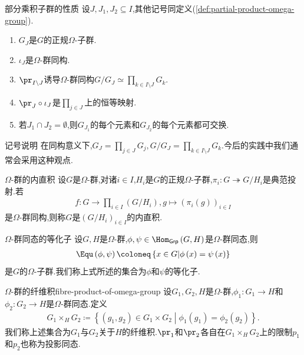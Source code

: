 \begin{proposition}{部分乘积子群的性质}{}
	设$J,J_{1},J_{2}\subseteq I$,其他记号同定义(\ref{def:partial-product-omega-group}).
	\begin{enumerate}
		\item $G_{J}$是$G$的正规$\Omega$-子群.
		\item $\iota_{J}$是$\Omega$-群同构.
		\item $\pr_{I\setminus J}$诱导$\Omega$-群同构$G/G_{J}\simeq\prod\limits_{k\in I\setminus J}G_{k}$.
		\item $\pr_{J}\circ\iota_{J}$是$\prod\limits_{j\in J}$上的恒等映射.
		\item 若$J_{1}\cap J_{2}=\emptyset$,则$G_{J_{1}}$的每个元素和$G_{J_{2}}$的每个元素都可交换.
	\end{enumerate}
\end{proposition}

\begin{remark}{记号说明}{}
	在同构意义下,$G_{J}=\prod\limits_{j\in J}G_{j},G/G_{J}=\prod\limits_{k\in I\setminus J}G_{k}$.今后的实践中我们通常会采用这种观点.
\end{remark}

\begin{definition}{$\Omega$-群的内直积}{}
	设$G$是$\Omega$-群,对诸$i\in I$,$H_{i}$是$G$的正规$\Omega$-子群,$\pi_{i}:G\twoheadrightarrow G/H_{i}$是典范投射.若
	\begin{align*}
		f:G\to\prod\limits_{i\in I}\left(G/H_{i}\right),g\mapsto\left(\pi_{i}\left(g\right)\right)_{i\in I}
	\end{align*}
	是$\Omega$-群同构,则称$G$是$\left(G/H_{i}\right)_{i\in I}$的内直积.
\end{definition}

\begin{definition}{$\Omega$-群同态的等化子}{}
	设$G,H$是$\Omega$-群,$\phi,\psi\in\Hom_{\mathsf{Grp}}\left(G,H\right)$是$\Omega$-群同态,则
	\begin{align*}
		\Equ\left(\phi,\psi\right)\coloneq\left\{x\in G\middle|\phi\left(x\right)=\psi\left(x\right)\right\}
	\end{align*}
	是$G$的$\Omega$-子群.我们称上式所述的集合为$\phi$和$\psi$的等化子.
\end{definition}

\begin{definition}{$\Omega$-群的纤维积}{fibre-product-of-omega-group}
	设$G_{1},G_{2},H$是$\Omega$-群,$\phi_{1}:G_{1}\to H$和$\phi_{2}:G_{2}\to H$是$\Omega$-群同态.定义
	\begin{align*}
		G_{1}\times_{H}G_{2}\coloneq\left\{\left(g_{1},g_{2}\right)\in G_{1}\times G_{2}\middle|\phi_{1}\left(g_{1}\right)=\phi_{2}\left(g_{2}\right)\right\}.
	\end{align*}
	我们称上述集合为$G_{1}$与$G_{2}$关于$H$的纤维积.$\pr_{1}$和$\pr_{2}$各自在$G_{1}\times_{H}G_{2}$上的限制$p_{1}$和$p_{2}$也称为投影同态.
\end{definition}

